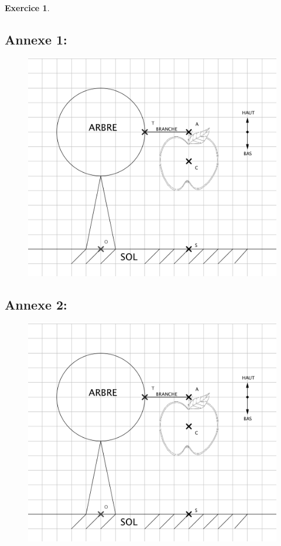 \documentclass[a4paper,10.9pt]{article}
\theoremstyle{definition}
\newtheorem{exo}{Exercice}
\begin{document}
\begin{exo}
\subsection*{Annexe 1:}
\begin{figure}[!h]
	\centering
	\includegraphics[scale=1.35]{DM_2.png}	
\end{figure}
\subsection*{Annexe 2:}
  \begin{figure}[!h]
    	\centering
    	\includegraphics[scale=1.35]{DM_2.png}	
    \end{figure}
\end{exo}
\end{document}
